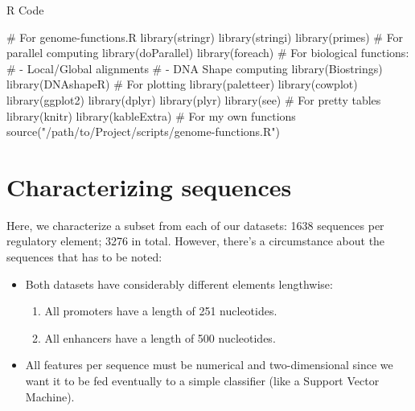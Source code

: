 \documentclass[
  letterpaper,
]{article}
\newenvironment{Shaded}{\begin{snugshade}}{\end{snugshade}}
\newcommand{\CommentTok}[1]{\textcolor[rgb]{0.37,0.37,0.37}{#1}}
\newcommand{\FunctionTok}[1]{\textcolor[rgb]{0.28,0.35,0.67}{#1}}
\newcommand{\NormalTok}[1]{\textcolor[rgb]{0.00,0.23,0.31}{#1}}
\newcommand{\StringTok}[1]{\textcolor[rgb]{0.13,0.47,0.30}{#1}}
\begin{document}
\begin{rheader}
R Code
\end{rheader}
\vspace{-1.75pt}

\begin{Shaded}
\begin{Highlighting}[]
\CommentTok{\# For genome{-}functions.R}
\FunctionTok{library}\NormalTok{(stringr)}
\FunctionTok{library}\NormalTok{(stringi)}
\FunctionTok{library}\NormalTok{(primes)}
\CommentTok{\# For parallel computing}
\FunctionTok{library}\NormalTok{(doParallel)}
\FunctionTok{library}\NormalTok{(foreach)}
\CommentTok{\# For biological functions: }
\CommentTok{\#   {-} Local/Global alignments }
\CommentTok{\#   {-} DNA Shape computing}
\FunctionTok{library}\NormalTok{(Biostrings)}
\FunctionTok{library}\NormalTok{(DNAshapeR)}
\CommentTok{\# For plotting}
\FunctionTok{library}\NormalTok{(paletteer)}
\FunctionTok{library}\NormalTok{(cowplot)}
\FunctionTok{library}\NormalTok{(ggplot2)}
\FunctionTok{library}\NormalTok{(dplyr)}
\FunctionTok{library}\NormalTok{(plyr)}
\FunctionTok{library}\NormalTok{(see)}
\CommentTok{\# For pretty tables}
\FunctionTok{library}\NormalTok{(knitr)}
\FunctionTok{library}\NormalTok{(kableExtra)}
\CommentTok{\# For my own functions}
\FunctionTok{source}\NormalTok{(}\StringTok{"/path/to/Project/scripts/genome{-}functions.R"}\NormalTok{)}
\end{Highlighting}
\end{Shaded}

\newpage

\section{Characterizing sequences}\label{characterizing-sequences}

Here, we characterize a subset from each of our datasets: 1638 sequences
per regulatory element; 3276 in total. However, there's a circumstance
about the sequences that has to be noted:

\begin{itemize}
\item
  Both datasets have considerably different elements lengthwise:

  \begin{enumerate}
  \def\labelenumi{\arabic{enumi}.}
  \item
    All promoters have a length of 251 nucleotides.
  \item
    All enhancers have a length of 500 nucleotides.
  \end{enumerate}
\item
  All features per sequence must be numerical and two-dimensional since
  we want it to be fed eventually to a simple classifier (like a Support
  Vector Machine).
\end{itemize}
\end{document}
